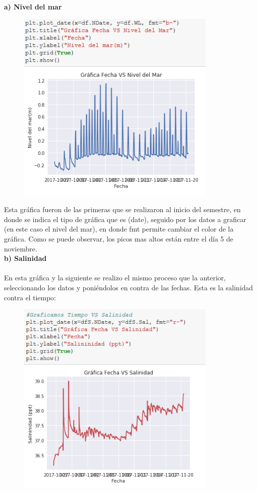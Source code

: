 \documentclass[12pt]{article}
\begin{document}
\noindent\textbf {a) Nivel del mar} \\
\begin{figure}[h!]
    \centering
\includegraphics[width=3.8in]{GrafF1.png}
\end{figure}

Esta gráfica fueron de las primeras que se realizaron al inicio del semestre, en donde se indica el tipo de gráfica que es (date), seguido por los datos a graficar (en este caso el nivel del mar), en donde fmt permite cambiar el color de la gráfica. Como se puede observar, los picos mas altos están entre el día 5 de noviembre.  \\

\noindent\textbf {b) Salinidad} \\ \\
En esta gráfica y la siguiente se realizo el mismo proceso que la anterior, seleccionando los datos y poniéndolos en contra de las fechas. Esta es la salinidad contra el tiempo:

\begin{figure}[h!]
    \centering
\includegraphics[width=3.8in]{GrafF2.png}
\end{figure}
\end{document}
